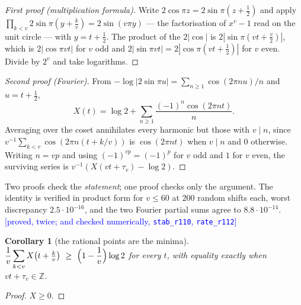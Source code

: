 \documentclass[11pt,a4paper]{article}
\theoremstyle{plain}
\newtheorem{corollary}[theorem]{Corollary}
\theoremstyle{definition}
\theoremstyle{remark}
\newcommand{\STATUS}[1]{\textcolor{blue}{\textsf{[#1]}}}
\begin{document}
\begin{proof}[First proof (multiplication formula)]
Write $2\cos\pi z=2\sin\pi(z+\tfrac12)$ and apply
$\prod_{k<v}2\sin\pi(y+\tfrac kv)=2\sin(v\pi y)$ --- the factorisation of $x^{v}-1$ read on the
unit circle --- with $y=t+\tfrac12$. The product of the $2|\cos|$ is $2|\sin\pi(vt+\tfrac v2)|$,
which is $2|\cos\pi vt|$ for $v$ odd and $2|\sin\pi vt|=2|\cos\pi(vt+\tfrac12)|$ for $v$ even.
Divide by $2^{v}$ and take logarithms.
\end{proof}

\begin{proof}[Second proof (Fourier)]
From $-\log|2\sin\pi u|=\sum_{n\ge1}\cos(2\pi nu)/n$ and $u=t+\tfrac12$,
\[
   X(t)=\log2+\sum_{n\ge1}\frac{(-1)^n\cos(2\pi nt)}{n}.
\]
Averaging over the coset annihilates every harmonic but those with $v\mid n$, since
$v^{-1}\sum_{k<v}\cos(2\pi n(t+k/v))$ is $\cos(2\pi nt)$ when $v\mid n$ and $0$ otherwise.
Writing $n=vp$ and using $(-1)^{vp}=(-1)^p$ for $v$ odd and $1$ for $v$ even, the surviving
series is $v^{-1}(X(vt+\tau_v)-\log2)$.
\end{proof}

\noindent
Two proofs check the \emph{statement}; one proof checks only the argument. The identity is
verified in product form for $v\le60$ at $200$ random shifts each, worst discrepancy
$2.5\cdot10^{-16}$, and the two Fourier partial sums agree to $8.8\cdot10^{-14}$.
\STATUS{proved, twice; and checked numerically, \texttt{stab\_r110}, \texttt{rate\_r112}}

\begin{corollary}[the rational points are the minima]\label{cor:floor}
$\displaystyle\frac1v\sum_{k<v}X\bigl(t+\tfrac kv\bigr)\ \ge\ \Bigl(1-\frac1v\Bigr)\log2$
for every $t$, with equality exactly when $vt+\tau_v\in\mathbb{Z}$.
\end{corollary}

\begin{proof}
$X\ge0$.
\end{proof}
\end{document}
